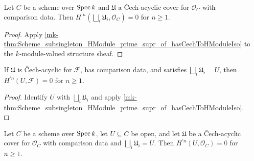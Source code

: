 \begin{theorem}\label{mk-thm:Scheme_subsingleton_HModule_prime_supr_of_hasCechToHModuleIso_curve}
  \leanok


  Let \(C\) be a scheme over \(\operatorname{Spec} k\) and \(\mathfrak U\) a \v{C}ech-acyclic cover for \(\mathcal O_C\) with comparison data. Then \(H^{\prime n}(\bigsqcup_i\mathfrak U_i,\mathcal O_C)=0\) for \(n\geq1\).
\end{theorem}

\begin{proof}
  \leanok


Apply \ref{mk-thm:Scheme_subsingleton_HModule_prime_supr_of_hasCechToHModuleIso} to the \(k\)-module-valued structure sheaf.
\end{proof}

\begin{theorem}\label{mk-thm:Scheme_subsingleton_HModule_prime_of_hasCechToHModuleIso}
  \leanok


  If \(\mathfrak U\) is \v{C}ech-acyclic for \(\mathcal F\), has comparison data, and satisfies \(\bigsqcup_i\mathfrak U_i=U\), then \(H^{\prime n}(U,\mathcal F)=0\) for \(n\geq1\).
\end{theorem}

\begin{proof}
  \leanok


Identify \(U\) with \(\bigsqcup_i\mathfrak U_i\) and apply \ref{mk-thm:Scheme_subsingleton_HModule_prime_supr_of_hasCechToHModuleIso}.
\end{proof}

\begin{theorem}\label{mk-thm:Scheme_subsingleton_HModule_prime_of_hasCechToHModuleIso_curve}
  \leanok


  Let \(C\) be a scheme over \(\operatorname{Spec} k\), let \(U\subseteq C\) be open, and let \(\mathfrak U\) be a \v{C}ech-acyclic cover for \(\mathcal O_C\) with comparison data and \(\bigsqcup_i\mathfrak U_i=U\). Then \(H^{\prime n}(U,\mathcal O_C)=0\) for \(n\geq1\).
\end{theorem}

